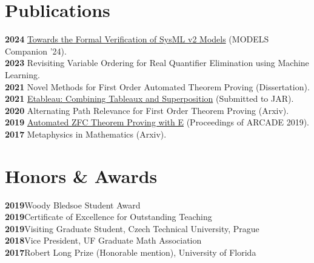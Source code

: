 \documentclass[10pt, letterpaper]{article}
\newcommand{\years}[1]{\textbf{#1}\hspace{1em}}
\begin{document}
\section*{Publications}
\years{2024}  \href{https://dl.acm.org/doi/10.1145/3652620.3687820}{Towards the Formal Verification of SysML v2 Models} (MODELS Companion '24).\\
\years{2023}  Revisiting Variable Ordering for Real Quantifier Elimination using Machine Learning.\\
\years{2021}  Novel Methods for First Order Automated Theorem Proving (Dissertation).\\
\years{2021}  \href{https://github.com/hesterj/Etableau}{Etableau:  Combining Tableaux and Superposition} (Submitted to JAR).\\
\years{2020}  Alternating Path Relevance for First Order Theorem Proving (Arxiv).\\
\years{2019}  \href{https://arxiv.org/abs/1902.00818}{Automated ZFC Theorem Proving with E} (Proceedings of ARCADE 2019).\\
\years{2017}  Metaphysics in Mathematics (Arxiv).\\

\section*{Honors \& Awards}
\noindent
\years{2019}Woody Bledsoe Student Award\\
\years{2019}Certificate of Excellence for Outstanding Teaching\\
\years{2019}Visiting Graduate Student, Czech Technical University, Prague\\
\years{2018}Vice President, UF Graduate Math Association\\
\years{2017}Robert Long Prize (Honorable mention), University of Florida
\end{document}
